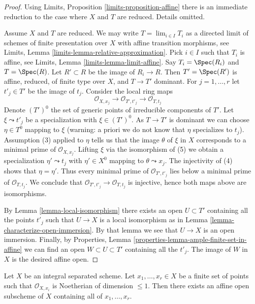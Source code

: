 \begin{proof}
Using Limits, Proposition \ref{limits-proposition-affine}
there is an immediate reduction to the case where $X$ and $T$ are reduced.
Details omitted.

\medskip\noindent
Assume $X$ and $T$ are reduced. We may write $T = \lim_{i \in I} T_i$
as a directed limit of schemes of finite presentation over $X$
with affine transition morphisms, see
Limits, Lemma \ref{limits-lemma-relative-approximation}.
Pick $i \in I$ such that $T_i$ is affine, see
Limits, Lemma \ref{limits-lemma-limit-affine}.
Say $T_i = \Spec(R_i)$ and $T = \Spec(R)$.
Let $R' \subset R$ be the image of $R_i \to R$.
Then $T' = \Spec(R')$ is affine, reduced, of finite type over $X$,
and $T \to T'$ dominant. For $j = 1, \ldots, r$ let $t'_j \in T'$
be the image of $t_j$. Consider the local ring maps
$$
\mathcal{O}_{X, x_j} \to
\mathcal{O}_{T', t'_j} \to
\mathcal{O}_{T, t_j}
$$
Denote $(T')^0$ the set of generic points of irreducible
components of $T'$. Let $\xi \leadsto t'_j$ be a specialization with
$\xi \in (T')^0$. As $T \to T'$ is dominant we can choose $\eta \in T^0$ 
mapping to $\xi$ (warning: a priori we do not know that $\eta$ specializes
to $t_j$). Assumption (3) applied to $\eta$ tells us that the image $\theta$
of $\xi$ in $X$ corresponds to a minimal prime of $\mathcal{O}_{X, x_j}$.
Lifting $\xi$ via the isomorphism of (5) we obtain a specialization
$\eta' \leadsto t_j$ with $\eta' \in X^0$ mapping to $\theta \leadsto x_j$.
The injectivity of (4) shows that $\eta = \eta'$. Thus
every minimal prime of $\mathcal{O}_{T', t'_j}$ lies below
a minimal prime of $\mathcal{O}_{T, t_j}$. We conclude that
$\mathcal{O}_{T', t'_j} \to \mathcal{O}_{T, t_j}$ is injective,
hence both maps above are isomorphisms.

\medskip\noindent
By Lemma \ref{lemma-local-isomorphism} there exists an open
$U \subset T'$ containing all the points $t'_j$ such that
$U \to X$ is a local isomorphism as in
Lemma \ref{lemma-characterize-open-immersion}.
By that lemma we see that $U \to X$ is an open immersion.
Finally, by
Properties, Lemma \ref{properties-lemma-ample-finite-set-in-affine}
we can find an open $W \subset U \subset T'$
containing all the $t'_j$. The image of $W$ in $X$ is the
desired affine open.
\end{proof}

\begin{lemma}
\label{lemma-finite-set-codim-1-points-in-affine}
Let $X$ be an integral separated scheme. Let $x_1, \ldots, x_r \in X$
be a finite set of points such that $\mathcal{O}_{X, x_i}$
is Noetherian of dimension $\leq 1$. Then there exists an affine
open subscheme of $X$ containing all of $x_1, \ldots, x_r$.
\end{lemma}

